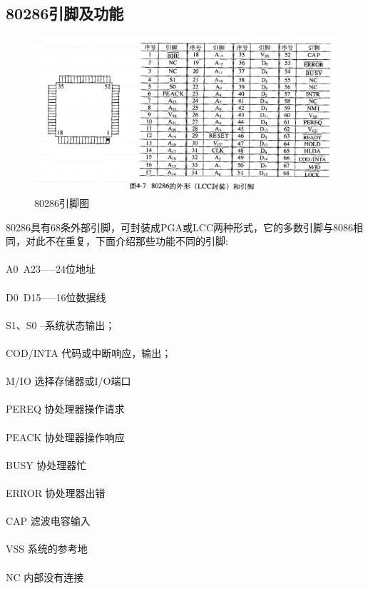\documentclass[12pt]{article}
\begin{document}
\subsection{80286引脚及功能}
\begin{figure}[htbp]
\centering
\includegraphics[scale=0.6]{fig/14.png}
\caption{80286引脚图}
\label{fig:Intel CPU 80286}
\end{figure}
80286具有68条外部引脚，可封装成PGA或LCC两种形式，它的多数引脚与8086相同，对此不在重复，下面介绍那些功能不同的引脚:\\\\
A0~A23-----24位地址\\\\
D0~D15-----16位数据线\\\\
S1、S0 --系统状态输出；\\\\
COD/INTA 代码或中断响应，输出；\\\\
M/IO  选择存储器或I/O端口\\\\
PEREQ 协处理器操作请求\\\\
PEACK 协处理器操作响应\\\\
BUSY  协处理器忙 \\\\ 
ERROR 协处理器出错\\\\
CAP 滤波电容输入\\\\
VSS  系统的参考地\\\\
NC  内部没有连接
\end{document}
